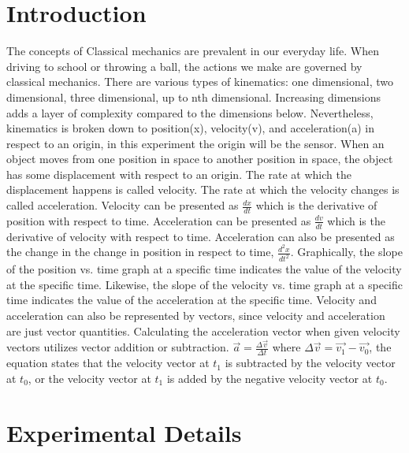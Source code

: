 \documentclass[aps,letterpaper,11pt]{revtex4}
\begin{document}
\section{Introduction}

The concepts of Classical mechanics are prevalent in our everyday life. When driving to school or throwing a ball, the actions we make are governed by classical mechanics. There are various types of kinematics: one dimensional, two dimensional, three dimensional, up to nth dimensional. Increasing dimensions adds a layer of complexity compared to the dimensions below. Nevertheless, kinematics is broken down to position(x), velocity(v), and acceleration(a) in respect to an origin, in this experiment the origin will be the sensor. When an object moves from one position in space to another position in space, the object has some displacement with respect to an origin. The rate at which the displacement happens is called velocity. The rate at which the velocity changes is called acceleration. Velocity can be presented as $\frac{dx}{dt}$ which is the derivative of position with respect to time. Acceleration can be presented as $\frac{dv}{dt}$ which is the derivative of velocity with respect to time. Acceleration can also be presented as the change in the change in position in respect to time, $\frac{d^2x}{dt^2}$. Graphically, the slope of the position vs. time graph at a specific time indicates the value of the velocity at the specific time. Likewise, the slope of the velocity vs. time graph at a specific time indicates the value of the acceleration at the specific time. Velocity and acceleration can also be represented by vectors, since velocity and acceleration are just vector quantities. Calculating the acceleration vector when given velocity vectors utilizes vector addition or subtraction. $\vec{a} = \frac{\Delta \vec{v}}{\Delta t}$ where $\Delta \vec{v} = \vec{v_1} - \vec{v_0}$, the equation states that the velocity vector at $t_1$ is subtracted by the velocity vector at $t_0$, or the velocity vector at $t_1$ is added by the negative velocity vector at $t_0$.

\newpage

\section{Experimental Details}
\end{document}
